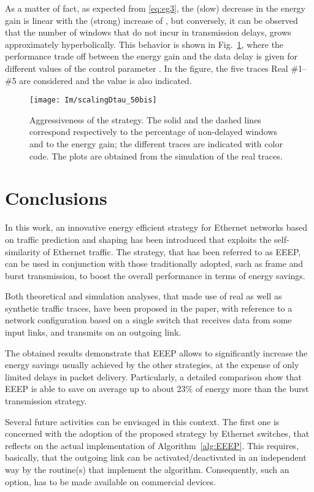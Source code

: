 \documentclass[journal,10pt,twoside,final]{IEEEtran}
\begin{document}
As a matter of fact, as expected from \eqref{eq:eg3}, the (slow) decrease in the energy gain is linear with the (strong) increase of , but conversely, it can be observed that the number of windows that do not incur in transmission delays, grows approximately hyperbolically.
This behavior is shown in Fig.~\ref{fig:scalingDtau}, where the performance trade off between the energy gain and the data delay is given for different values of the control parameter . In the figure, the five traces Real \#1--\#5 are considered and the value  is also indicated.
\begin{figure}[ht]
\centering
\texttt{[image: Im/scalingDtau\_50bis]}
\caption{Aggressiveness of the strategy. The solid and the dashed lines correspond respectively to the percentage of non-delayed windows and to the energy gain; the different traces are indicated with color code. The plots are obtained from the simulation of the real traces. } 
\label{fig:scalingDtau}
\end{figure}

\section{Conclusions}
\label{sec:conclusions}


In this work, an innovative energy efficient strategy for Ethernet networks based on traffic prediction and shaping has been introduced that exploits the self-similarity of Ethernet traffic. The strategy, that has been referred to as EEEP, can be used in conjunction with those traditionally adopted, such as frame and burst transmission, to boost the overall performance in terms of energy savings. 

Both theoretical and simulation analyses, that made use of real as well as synthetic traffic traces, have been proposed in the paper, with reference to a network configuration based on a single switch that receives data from some input links, and transmits on an outgoing link. 

The obtained results demonstrate that EEEP allows to significantly increase the energy savings usually achieved by the other strategies, at the expense of only limited delays in packet delivery. Particularly, a detailed comparison show that EEEP is able to save on average up to about 23\% of energy more than the burst transmission strategy.   

Several future activities can be envisaged in this context. The first one is concerned with the adoption of the proposed strategy by Ethernet switches, that reflects on the actual implementation of Algorithm~\ref{alg:EEEP}. This requires, basically, that the outgoing link can be activated/deactivated in an independent way by the routine(s) that implement the algorithm. Consequently, such an option, has to be made available on commercial devices.
\end{document}
